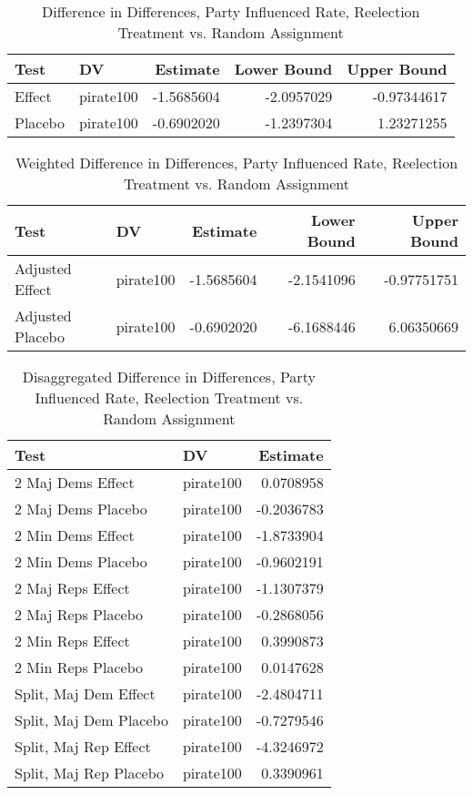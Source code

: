 \documentclass[12pt]{article}
\begin{document}
\begin{table}[H]
	\centering
	\caption{Difference in Differences, Party Influenced Rate, Reelection Treatment vs. Random Assignment}
	\begin{tabular}{llrrr}
		\hline
		Test & DV & Estimate & Lower Bound & Upper Bound \\ 
		\hline
		Effect & pirate100 & -1.5685604 & -2.0957029 & -0.97344617 \\ 
		Placebo & pirate100 & -0.6902020 & -1.2397304 & 1.23271255 \\ 
		\hline
	\end{tabular}
\end{table}

\begin{table}[H]
	\centering
	\caption{Weighted Difference in Differences, Party Influenced Rate, Reelection Treatment vs. Random Assignment}
	\begin{tabular}{llrrr}
		\hline
		Test & DV & Estimate & Lower Bound & Upper Bound \\  
		\hline
		Adjusted Effect & pirate100 & -1.5685604 & -2.1541096 & -0.97751751 \\ 
		Adjusted Placebo & pirate100 & -0.6902020 & -6.1688446 & 6.06350669 \\ 
		\hline
	\end{tabular}
\end{table}

\begin{table}[H]
	\centering
	\caption{Disaggregated Difference in Differences, Party Influenced Rate, Reelection Treatment vs. Random Assignment}
	\begin{tabular}{llr}
		\hline
		Test & DV & Estimate \\ 
		\hline
		2 Maj Dems Effect & pirate100 & 0.0708958 \\ 
		2 Maj Dems Placebo & pirate100 & -0.2036783 \\ 
		2 Min Dems Effect & pirate100 & -1.8733904 \\ 
		2 Min Dems Placebo & pirate100 & -0.9602191 \\ 
		2 Maj Reps Effect & pirate100 & -1.1307379 \\ 
		2 Maj Reps Placebo & pirate100 & -0.2868056 \\ 
		2 Min Reps Effect & pirate100 & 0.3990873 \\ 
		2 Min Reps Placebo & pirate100 & 0.0147628 \\ 
		Split, Maj Dem Effect & pirate100 & -2.4804711 \\ 
		Split, Maj Dem Placebo & pirate100 & -0.7279546 \\ 
		Split, Maj Rep Effect & pirate100 & -4.3246972 \\ 
		Split, Maj Rep Placebo & pirate100 & 0.3390961 \\ 
		\hline
	\end{tabular}
\end{table}
\end{document}
